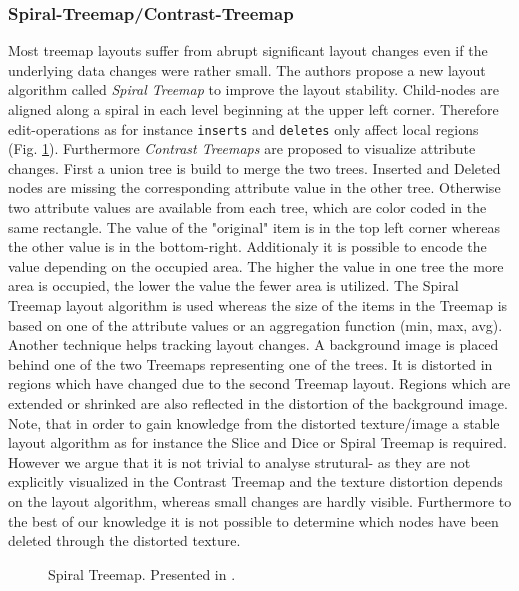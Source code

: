 \subsubsection{Spiral-Treemap/Contrast-Treemap\cite{tu2007visualizing}}
Most treemap layouts suffer from abrupt significant layout changes even if the underlying data changes were rather small. The authors propose a new layout algorithm called \emph{Spiral Treemap} to improve the layout stability. Child-nodes are aligned along a spiral in each level beginning at the upper left corner. Therefore edit-operations as for instance \texttt\texttt{inserts} and \texttt{deletes} only affect local regions (Fig. \ref{fig:treemap-spiral}). Furthermore \emph{Contrast Treemaps} are proposed to visualize attribute changes. First a union tree is build to merge the two trees. Inserted and Deleted nodes are missing the corresponding attribute value in the other tree. Otherwise two attribute values are available from each tree, which are color coded in the same rectangle. The value of the "original" item is in the top left corner whereas the other value is in the bottom-right. Additionaly it is possible to encode the value depending on the occupied area. The higher the value in one tree the more area is occupied, the lower the value the fewer area is utilized. The Spiral Treemap layout algorithm is used whereas the size of the items in the Treemap is based on one of the attribute values or an aggregation function (min, max, avg). Another technique helps tracking layout changes. A background image is placed behind one of the two Treemaps representing one of the trees. It is distorted in regions which have changed due to the second Treemap layout. Regions which are extended or shrinked are also reflected in the distortion of the background image. Note, that in order to gain knowledge from the distorted texture/image a stable layout algorithm as for instance the Slice and Dice or Spiral Treemap is required. However we argue that it is not trivial to analyse strutural- as they are not explicitly visualized in the Contrast Treemap and the texture distortion depends on the layout algorithm, whereas small changes are hardly visible. Furthermore to the best of our knowledge it is not possible to determine which nodes have been deleted through the distorted texture. 

\begin{figure}[tb]
\caption{\label{fig:treemap-spiral} Spiral Treemap. Presented in \cite{tu2007visualizing}.}
\end{figure}

